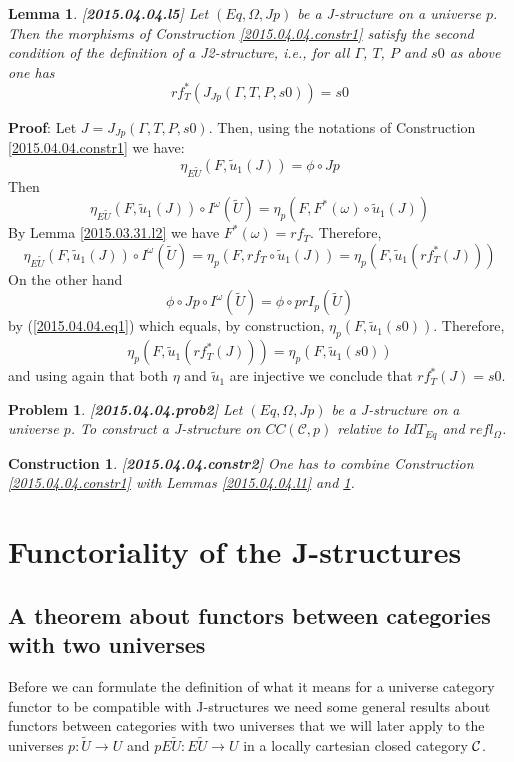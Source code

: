 \documentclass[12pt]{article}
\newenvironment{myproof}{{\bf Proof}:}{\vskip 5mm }
\newtheorem{lemma}[proposition]{Lemma}
\newtheorem{problem}[proposition]{Problem}
\newtheorem{construction}[proposition]{Construction}
\newcommand{\llabel}[1]{\label{#1}[{\bf #1}]}
\newcommand{\sr}{\rightarrow}
\newcommand{\wt}{\widetilde}
\begin{document}
%
\begin{lemma}
\llabel{2015.04.04.l5}
Let $(Eq,\Omega,Jp)$ be a J-structure on a universe $p$. Then the morphisms of  Construction \ref{2015.04.04.constr1} satisfy the second condition of the definition of a J2-structure, i.e., for all $\Gamma$, $T$, $P$ and $s0$ as above one has
%
$$rf_T^*(J_{Jp}(\Gamma,T,P,s0))=s0$$
%
\end{lemma}
%
\begin{myproof}
Let $J=J_{Jp}(\Gamma,T,P,s0)$. Then, using the notations of Construction \ref{2015.04.04.constr1} we have:
%
$$\eta_{E\wt{U}}(F,\wt{u}_1(J))=\phi\circ Jp$$
%
Then
%
$$\eta_{E\wt{U}}(F,\wt{u}_1(J))\circ I^{\omega}(\wt{U})=\eta_p(F,F^*(\omega)\circ \wt{u}_1(J))$$
%
By Lemma \ref{2015.03.31.l2} we have $F^*(\omega)=rf_T$. Therefore,
%
$$\eta_{E\wt{U}}(F,\wt{u}_1(J))\circ I^{\omega}(\wt{U})=\eta_p(F,rf_T\circ \wt{u}_1(J))=\eta_p(F,\wt{u}_1(rf_T^*(J)))$$
%
On the other hand
%
$$\phi\circ Jp\circ I^{\omega}(\wt{U})=\phi\circ prI_p(\wt{U})$$
%
by (\ref{2015.04.04.eq1}) which equals, by construction, $\eta_p(F,\wt{u}_1(s0))$. Therefore,
%
$$\eta_p(F,\wt{u}_1(rf_T^*(J)))=\eta_p(F,\wt{u}_1(s0))$$
%
and using again that both $\eta$ and $\wt{u}_1$ are injective we conclude that $rf_T^*(J)=s0$. 
\end{myproof}
%
\begin{problem}
\llabel{2015.04.04.prob2}
Let $(Eq,\Omega,Jp)$ be a J-structure on a universe $p$. To construct a J-structure on $CC({\mathcal C},p)$ relative to $IdT_{Eq}$ and $refl_{\Omega}$.
\end{problem} 
%
\begin{construction}\rm
\llabel{2015.04.04.constr2}
One has to combine Construction \ref{2015.04.04.constr1} with Lemmas \ref{2015.04.04.l1} and \ref{2015.04.04.l5}.
\end{construction}
%





\section{Functoriality of the J-structures}




\subsection{A theorem about functors between categories with two universes}
\label{twouniv}
%
Before we can formulate the definition of what it means for a universe category functor to be compatible with J-structures we need some general results about functors between categories with two universes that we will later apply to the universes $p:\wt{U}\sr U$ and $pE\wt{U}:E\wt{U}\sr U$ in a locally cartesian closed category $\cal C$. 
\end{document}
